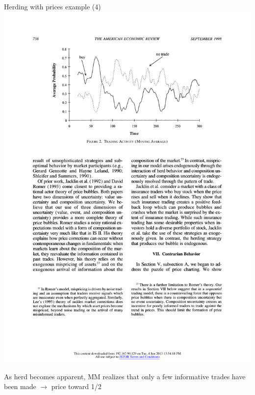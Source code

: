 \documentclass[english,10pt
,aspectratio=169
]{beamer}
\begin{document}
\begin{frame}{Herding with prices example (4)}
	\includegraphics[width=0.4\paperwidth]{pics/TradeInBubble}
	
	As herd becomes apparent, MM realizes that only a few informative trades have been made $\rightarrow$ price toward 1/2
\end{frame}
\end{document}
